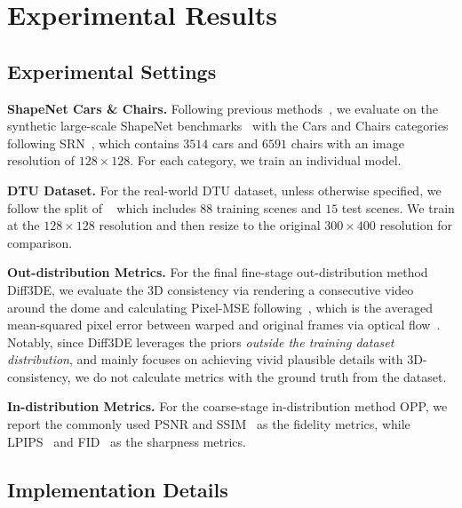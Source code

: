 







\section{\textbf{Experimental Results}}
\subsection{\textbf{Experimental Settings}}

\noindent\textbf{ShapeNet Cars \& Chairs.}
Following previous methods~\cite{PixelNeRF_yu2021pixelnerf, FE_NVS_guo2022fast}, we evaluate on the synthetic large-scale ShapeNet benchmarks~\cite{ShapeNet_chang2015shapenet} with the Cars and Chairs categories following SRN~\cite{SRN_sitzmann2019scene}, which contains $3514$ cars and $6591$ chairs with an image resolution of $128 \times 128$. For each category, we train an individual model. 


\noindent\textbf{DTU Dataset.}
For the real-world DTU dataset, unless otherwise specified, we follow the split of ~\cite{PixelNeRF_yu2021pixelnerf} which includes $88$ training scenes and $15$ test scenes. We train at the $128\times128$ resolution and then resize to the original $300 \times 400$ resolution for comparison.

\noindent\textbf{Out-distribution Metrics.}
For the final fine-stage out-distribution method Diff3DE, we evaluate the 3D consistency via rendering a consecutive video around the dome and calculating Pixel-MSE following~\cite{ceylan2023pix2video}, which is the averaged mean-squared pixel error between warped and original frames via optical flow~\cite{teed2020raft}. Notably, since Diff3DE leverages the priors \textit{outside the training dataset distribution}, and mainly focuses on achieving vivid {plausible} details with {3D-consistency}, we do not calculate metrics with the ground truth from the dataset.


\noindent\textbf{In-distribution Metrics.}
For the coarse-stage in-distribution method OPP, we report the commonly used PSNR and SSIM~
\cite{PSNR_wang2004image} as the fidelity metrics, while LPIPS~\cite{LPIPS_zhang2018unreasonable} and FID~\cite{FID_heusel2017gans} as the sharpness metrics. 

 
\vspace{-2mm}
\subsection{\textbf{Implementation Details}}

